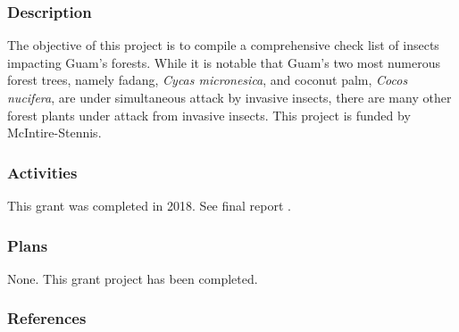 \begin{refsection}
	
	\subsubsection{Description}
	
	The objective of this project is to compile a comprehensive check
	list of insects impacting Guam's forests. While it is notable that
	Guam's two most numerous forest trees, namely fadang, \emph{Cycas
		micronesica}, and coconut palm, \emph{Cocos nucifera}, are under simultaneous
	attack by invasive insects, there are many other forest plants under
	attack from invasive insects. This project is funded by McIntire-Stennis.
	
	\subsubsection{Activities}
	
	This grant was completed in 2018. See final report \cite{moore_aubreymoore/mcintire-stennis_2018}.
	
	\begin{comment}
	\raggedright\vspace{2mm}\textbf{Activity}
	\begin{itemize}
	\item I work closely with Jim McConnell's Guam Plant Extinction Prevention
	Program. Many of Guam's rare plants are being attacked by invasive
	insects. I routinely identify and document insect specimens collected
	from the GPEPP plant nursery and from field surveys.
	\item Annual report \cite{moore2018mcintirestennis2}.
	\item Proposal \cite{moore2018mcintirestennis}.
	\end{itemize}
	\raggedright\vspace{2mm}\textbf{Reference(s)}
	
	\begin{btSect}[vancouver]{zotero}
	\btPrintCited
	\end{btSect}
	\newpage{}
	\end{btUnit}
	
	\begin{btUnit}
	\end{comment}
	
	\subsubsection{Plans}
	
	None. This grant project has been completed.
	
	\subsubsection{References}
	\printbibliography[heading=none]
\end{refsection}


